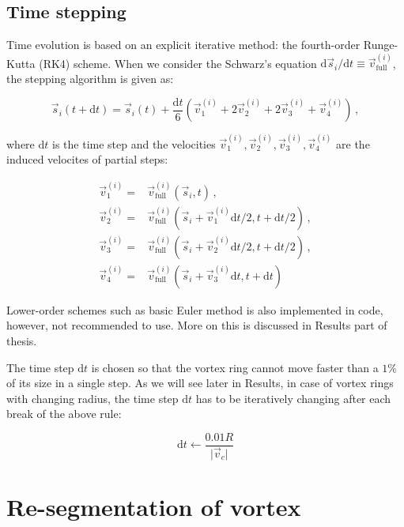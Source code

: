 \subsection*{Time stepping}

Time evolution is based on an explicit iterative method: the fourth-order Runge-Kutta (RK4) scheme. When we consider the Schwarz's equation $\text{d}\vec{s}_i / \text{d}t \equiv \vec{v}_{\text{full}}^{(i)}$, the stepping algorithm is given as:

\begin{equation}
\vec{s}_{i}(t+\text{d}t) =
\vec{s}_{i}(t) +
\frac{\text{d}t}{6} (\vec{v}_1^{(i)} + 2\vec{v}_2^{(i)} + 2\vec{v}_3^{(i)} + \vec{v}_4^{(i)})\,,
\end{equation}

where $\text{d}t$ is the time step and the velocities $\vec{v}_1^{(i)}, \vec{v}_2^{(i)}, \vec{v}_3^{(i)}, \vec{v}_4^{(i)}$ are the induced velocites of partial steps:

\begin{align}
\vec{v}_1^{(i)} =& \vec{v}_{\text{full}}^{(i)}
(\vec{s}_i, t)\,,
\\
\vec{v}_2^{(i)} =& \vec{v}_{\text{full}}^{(i)}
(\vec{s}_i + \vec{v}_1^{(i)} \text{d}t / 2, t + \text{d}t / 2)\,,
\\
\vec{v}_3^{(i)} =& \vec{v}_{\text{full}}^{(i)}
(\vec{s}_i + \vec{v}_2^{(i)} \text{d}t / 2, t + \text{d}t / 2)\,,
\\
\vec{v}_4^{(i)} =& \vec{v}_{\text{full}}^{(i)}
(\vec{s}_i + \vec{v}_3^{(i)} \text{d}t, t + \text{d}t)
\end{align}

Lower-order schemes such as basic Euler method is also implemented in code, however, not recommended to use. More on this is discussed in Results part of thesis.

The time step $\text{d}t$ is chosen so that the vortex ring cannot move faster than a $1\%$ of its size in a single step. As we will see later in Results, in case of vortex rings with changing radius, the time step $\text{d}t$ has to be iteratively changing after each break of the above rule:

\begin{equation}
\text{d}t \leftarrow \frac{0.01 R}{\vert \vec{v}_c \vert}
\end{equation}

\section{Re-segmentation of vortex}

